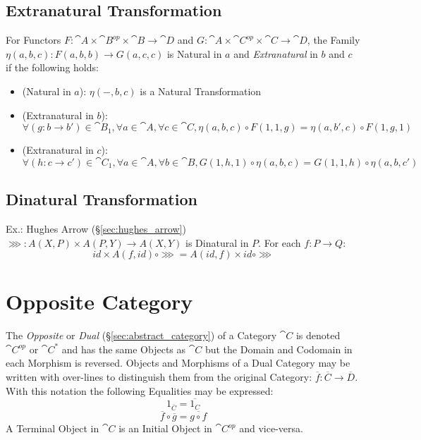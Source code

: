 \subsection{Extranatural Transformation}
\label{sec:extranatural_transformation}

For Functors $F : \cat{A} \times \cat{B}^{op} \times \cat{B}
\rightarrow \cat{D}$ and $G : \cat{A} \times \cat{C}^{op} \times
\cat{C} \rightarrow \cat{D}$, the Family $\eta(a,b,c) : F(a,b,b)
\rightarrow G(a,c,c)$ is Natural in $a$ and \emph{Extranatural} in $b$
and $c$ if the following holds:
\begin{itemize}
  \item (Natural in $a$): $\eta (-,b,c)$ is a Natural Transformation
  \item (Extranatural in $b$): $\forall (g:b \rightarrow b') \in
    \cat{B}_1, \forall a \in \cat{A}, \forall c \in \cat{C},
    \eta(a,b,c) \circ F(1,1,g) = \eta(a,b',c) \circ F(1,g,1)$
  \item (Extranatural in $c$): $\forall (h:c \rightarrow c') \in
    \cat{C}_1, \forall a \in \cat{A}, \forall b \in \cat{B}, G(1,h,1)
    \circ \eta(a,b,c) = G(1,1,h) \circ \eta(a,b,c')$
\end{itemize}



\subsection{Dinatural Transformation}
\label{sec:dinatural_transformation}

Ex.: Hughes Arrow (\S\ref{sec:hughes_arrow}) $\ggg : A (X,P) \times A
(P,Y) \rightarrow A (X,Y)$ is Dinatural in $P$. For each $f : P
\rightarrow Q$:
\[
  id \times A(f,id) \circ \ggg = A(id,f) \times id \circ \ggg
\]



\section{Opposite Category}\label{sec:opposite_category}

The \emph{Opposite} or \emph{Dual} (\S\ref{sec:abstract_category})
of a Category $\cat{C}$ is denoted $\cat{C^{op}}$ or
$\cat{C^*}$ and has the same Objects as $\cat{C}$ but the Domain
and Codomain in each Morphism is reversed. Objects and Morphisms of a
Dual Category may be written with over-lines to distinguish them from
the original Category: $\overline{f}: \overline{C} \rightarrow
\overline{D}$. With this notation the following Equalities may be
expressed:
\[
  1_{\overline{C}} = \overline{1_C}
\]\[
  \overline{f} \circ \overline{g} = \overline{g \circ f}
\]
A Terminal Object in $\cat{C}$ is an Initial Object in
$\cat{C^{op}}$ and vice-versa.


